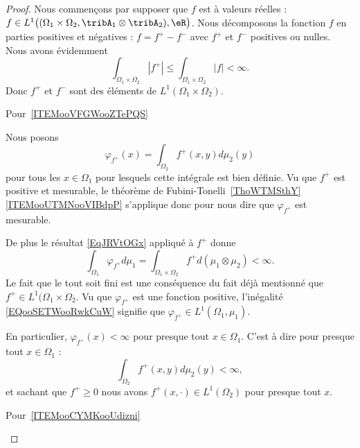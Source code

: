 \begin{proof}
    Nous commençons par supposer que \( f\) est à valeurs réelles : \( f\in L^1\big( (\Omega_1\times \Omega_2,\tribA_1\otimes\tribA_2 ),\eR\big)\). Nous décomposons la fonction \( f\) en parties positives et négatives : \( f=f^+-f^-\) avec \( f^+\) et \( f^-\) positives ou nulles. Nous avons évidemment
    \begin{equation}
        \int_{\Omega_1\times \Omega_2}| f^+ |\leq \int_{\Omega_1\times \Omega_2}| f |<\infty.
    \end{equation}
    Donc \( f^+\) et \( f^-\) sont des éléments de \( L^1(\Omega_1\times \Omega_2)\).

    \begin{subproof}
    \item[Pour~\ref{ITEMooVFGWooZTePQS}]

    Nous posons
    \begin{equation}
        \varphi_{f^+}(x)=\int_{\Omega_2}f^{+}(x,y)d\mu_2(y)
    \end{equation}
    pour tous les \( x\in \Omega_1\) pour lesquels cette intégrale est bien définie. Vu que \( f^+\) est positive et mesurable, le théorème de Fubini-Tonelli~\ref{ThoWTMSthY}\ref{ITEMooUTMNooVIBdpP} s'applique donc pour nous dire que \( \varphi_{f^+}\) est mesurable.

    De plus le résultat \eqref{EqJRVtOGx} appliqué à \( f^+\) donne
    \begin{equation}        \label{EQooSETWooRwkCuW}
        \int_{\Omega_1}\varphi_{f^+}d\mu_1=\int_{\Omega_1\times \Omega_2}f^+d(\mu_1\otimes \mu_2)<\infty.
    \end{equation}
    Le fait que le tout soit fini est une conséquence du fait déjà mentionné que \( f^+\in L^1(\Omega_1\times \Omega_2\). Vu que \( \varphi_{f^+}\) est une fonction positive, l'inégalité \eqref{EQooSETWooRwkCuW} signifie que \( \varphi_{f^+}\in L^1(\Omega_1,\mu_1)\).

    En particulier, \( \varphi_{f^+}(x)<\infty\) pour presque tout \( x\in\Omega_1\). C'est à dire pour presque tout \( x\in \Omega_1\) :
    \begin{equation}
        \int_{\Omega_2}f^+(x,y)d\mu_2(y)<\infty,
    \end{equation}
    et sachant que \( f^+\geq 0\) nous avons \( f^+(x,\cdot)\in L^1(\Omega_2)\) pour presque tout \( x\).

        \item[Pour~\ref{ITEMooCYMKooUdizni}]


\end{subproof}
\end{proof}
